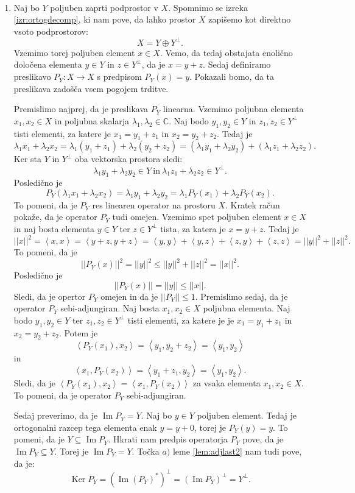 \documentclass[12pt,a4paper,oneside,fleqn,openany]{book}
\newcommand{\eopf}{\raisebox{0.8ex}{\framebox{}}} %
\newenvironment{dokaz}%
{\noindent{\bf Dokaz.}\ }%
{\hfill\eopf\par\bigskip}%
\newcommand{\C}{\mathbb{C}}
\newcommand{\abs}[1]{\ensuremath{\lvert #1 \rvert}}
\newcommand{\norm}[1]{\abs{\abs{#1}}}
\newcommand{\Sp}[2]{\ensuremath{\left<#1, #2\right>}}
\newcommand{\map}[3]{\ensuremath{{#1}:{#2}\rightarrow{#3}}}
\begin{document}
\begin{dokaz}
	\begin{enumerate}
		\item Naj bo $Y$ poljuben zaprti podprostor v $X$. Spomnimo se izreka \ref{izr:ortogdecomp}, ki nam pove, da lahko prostor $X$ zapišemo kot direktno vsoto podprostorov: $$X = Y \oplus Y^\bot.$$ Vzemimo torej poljuben element $x\in X$. Vemo, da tedaj obstajata enolično določena elementa $y\in Y$ in $z\in Y^\bot$, da je $x = y + z$. Sedaj definiramo preslikavo $\map{P_Y}{X}{X}$ s predpisom $P_Y(x) = y$. Pokazali bomo, da ta preslikava zadošča vsem pogojem trditve.
		
		Premislimo najprej, da je preslikava $P_Y$ linearna. Vzemimo poljubna elementa $x_1, x_2\in X$ in poljubna skalarja $\lambda_1, \lambda_2\in \C$. Naj bodo $y_1, y_2\in Y$ in $z_1, z_2\in Y^\bot$ tisti elementi, za katere je $x_1 = y_1 + z_1$ in $x_2 = y_2 + z_2$. Tedaj je $$\lambda_1x_1 + \lambda_2x_2 = \lambda_1(y_1 + z_1) + \lambda_2(y_2 + z_2) = (\lambda_1y_1 + \lambda_2y_2) + (\lambda_1z_1 + \lambda_2z_2).$$ Ker sta $Y$ in $Y^\bot$ oba vektorska prostora sledi: $$\lambda_1y_1 + \lambda_2y_2\in Y~\text{in}~\lambda_1z_1 + \lambda_2z_2\in Y^\bot.$$ Posledično je $$P_Y(\lambda_1x_1 + \lambda_2x_2)= \lambda_1y_1 + \lambda_2y_2 = \lambda_1P_Y(x_1) + \lambda_2P_Y(x_2).$$ To pomeni, da je $P_Y$ res linearen operator na prostoru $X$. Kratek račun pokaže, da je operator $P_Y$ tudi omejen. Vzemimo spet poljuben element $x\in X$ in naj bosta elementa $y\in Y$ ter $z\in Y^\bot$ tista, za katera je $x = y + z$. Tedaj je $$\norm{x}^2=\Sp{x}{x}=\Sp{y+z}{y+z}=\Sp{y}{y}+\Sp{y}{z}+\Sp{z}{y}+\Sp{z}{z}=\norm{y}^2 + \norm{z}^2.$$ To pomeni, da je $$\norm{P_Y(x)}^2 = \norm{y}^2 \leq \norm{y}^2 + \norm{z}^2 =\norm{x}^2.$$ Posledično je $$\norm{P_Y(x)}=\norm{y}\leq \norm{x} .$$ Sledi, da je opertor $P_Y$ omejen in da je $\norm{P_Y}\leq 1$.
		Premislimo sedaj, da je operator $P_Y$ sebi-adjungiran. Naj bosta $x_1, x_2\in X$ poljubna elementa. Naj bodo $y_1, y_2\in Y$ ter $z_1, z_2\in Y^\bot$ tisti elementi, za katere je je $x_1 = y_1 + z_1$ in $x_2 = y_2 + z_2$. Potem je $$\Sp{P_Y(x_1)}{x_2} = \Sp{y_1}{y_2 + z_2} = \Sp{y_1}{y_2}$$ in $$\Sp{x_1}{P_Y(x_2)} = \Sp{y_1+ z_1}{y_2} = \Sp{y_1}{y_2}.$$ Sledi, da je $\Sp{P_Y(x_1)}{x_2} = \Sp{x_1}{P_Y(x_2)}$ za vsaka elementa $x_1, x_2 \in X$. To pomeni, da je operator $P_Y$ sebi-adjungiran.
		
		Sedaj preverimo, da je $\operatorname{Im}P_Y = Y$. Naj bo $y\in Y$ poljuben element. Tedaj je ortogonalni razcep tega elementa enak $y = y + 0$, torej je $P_Y(y) = y$. To pomeni, da je $Y\subseteq \operatorname{Im}P_Y$. Hkrati nam predpis operatorja $P_Y$ pove, da je $\operatorname{Im}P_Y \subseteq Y$. Torej je $\operatorname{Im}P_Y = Y$. Točka $a)$ leme \ref{lem:adjlast2} nam tudi pove, da je: $$\operatorname{Ker}P_Y = (\operatorname{Im}(P_Y)^*)^\bot = (\operatorname{Im}P_Y)^\bot = Y^\bot.$$
		

\end{enumerate}
\end{dokaz}
\end{document}
